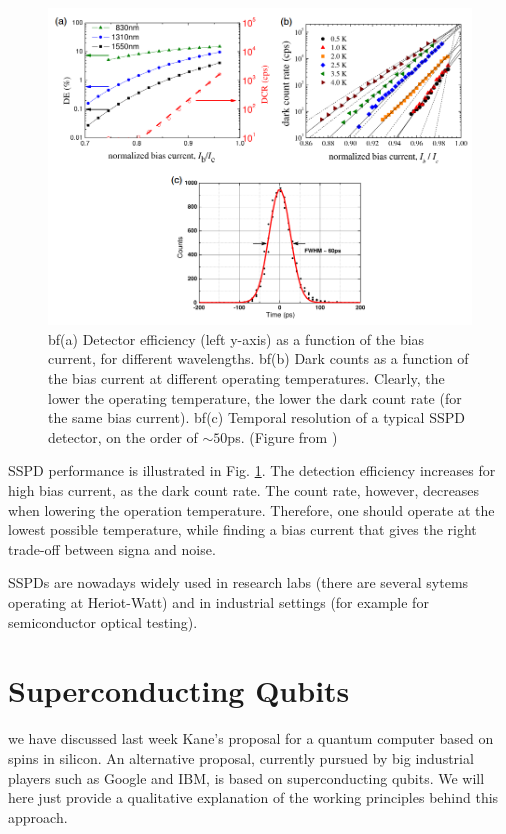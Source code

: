 \documentclass[a4paper,11pt]{article}
\begin{document}
\begin{figure}[h]
\centering
\includegraphics[width = 1\textwidth]{figures/SSPD_performance.png}
\caption{{bf(a)} Detector efficiency (left y-axis) as a function of the bias current, for different wavelengths. {bf(b)} Dark counts as a function of the bias current at different operating temperatures. Clearly, the lower the operating temperature, the lower the dark count rate (for the same bias current). {bf(c)} Temporal resolution of a typical SSPD detector, on the order of $\sim 50$ps. (Figure from \cite{natarajan_superconducting_2012})}
\label{fig:SSPD_perf}
\end{figure}


SSPD performance is illustrated in Fig. \ref{fig:SSPD_perf}. The detection efficiency increases for high bias current, as the dark count rate. The count rate, however, decreases when lowering the operation temperature. Therefore, one should operate at the lowest possible temperature, while finding a bias current that gives the right trade-off between signa and noise.

SSPDs are nowadays widely used in research labs (there are several sytems operating at Heriot-Watt) and in industrial settings (for example for semiconductor optical testing).

\section {Superconducting Qubits}
we have discussed last week Kane's proposal for a quantum computer based on spins in silicon. An alternative proposal, currently pursued by big industrial players such as Google and IBM, is based on superconducting qubits. We will here just provide a qualitative explanation of the working principles behind this approach.
\end{document}
